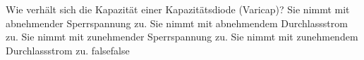     {Wie verhält sich die Kapazität einer Kapazitätsdiode (Varicap)?}
    {Sie nimmt mit abnehmender Sperrspannung zu.}
    {Sie nimmt mit abnehmendem Durchlassstrom zu.}
    {Sie nimmt mit zunehmender Sperrspannung zu.}
    {Sie nimmt mit zunehmendem Durchlassstrom zu.}
    {false}{false}